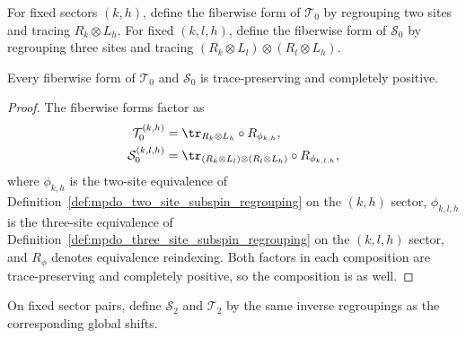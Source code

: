 \begin{definition}
    \label{def:mpdo_fiberwise_partial_trace_maps}
    \leanok
    For fixed sectors $(k,h)$, define the fiberwise form of $\mathcal T_0$ by
    regrouping two sites and tracing $R_k\otimes L_h$. For fixed
    $(k,l,h)$, define the fiberwise form of $\mathcal S_0$ by regrouping three
    sites and tracing
    $(R_k\otimes L_l)\otimes(R_l\otimes L_h)$.
\end{definition}

\begin{lemma}
    \label{thm:mpdo_fiberwise_partial_trace_maps_cptp}
    \leanok
    Every fiberwise form of $\mathcal T_0$ and $\mathcal S_0$ is
    trace-preserving and completely positive.
\end{lemma}
\begin{proof}
    \leanok

    The fiberwise forms factor as
    \begin{align}
        \mathcal T_0^{(k,h)}
         & =\tr_{R_k\otimes L_h}\circ R_{\phi_{k,h}}, \notag \\
        \mathcal S_0^{(k,l,h)}
         & =\tr_{(R_k\otimes L_l)\otimes(R_l\otimes L_h)}
        \circ R_{\phi_{k,l,h}}, \notag
    \end{align}
    where $\phi_{k,h}$ is the two-site equivalence of
    Definition~\ref{def:mpdo_two_site_subspin_regrouping} on the $(k,h)$
    sector, $\phi_{k,l,h}$ is the three-site equivalence of
    Definition~\ref{def:mpdo_three_site_subspin_regrouping} on the $(k,l,h)$
    sector, and $R_\phi$ denotes equivalence reindexing. Both factors in each
    composition are trace-preserving and completely positive, so the
    composition is as well.
\end{proof}

\begin{definition}
    \label{def:mpdo_fiberwise_shifts}
    \leanok
    On fixed sector pairs, define $\mathcal S_2$ and $\mathcal T_2$ by the
    same inverse regroupings as the corresponding global shifts.
\end{definition}

